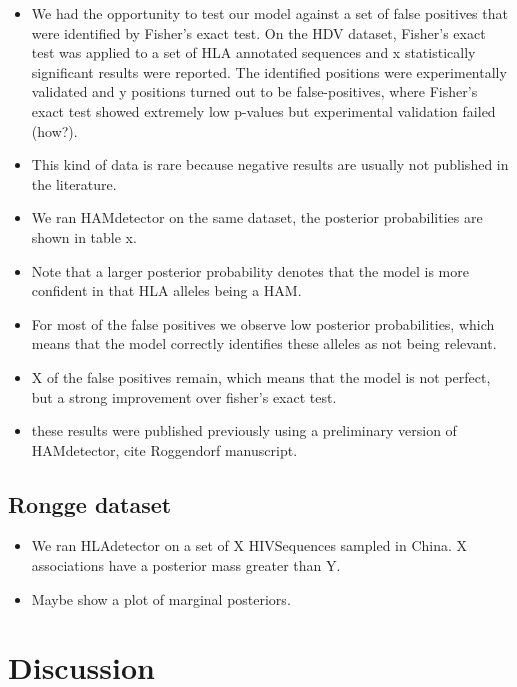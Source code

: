 \documentclass[fleqn,11pt]{SelfArx} %
\begin{document}
\begin{itemize}
  \item We had the opportunity to test our model against a set of false positives that were identified by Fisher's exact test. On the HDV dataset, Fisher's exact test was applied to a set of HLA annotated sequences and x statistically significant results were reported. The identified positions were experimentally validated and y positions turned out to be false-positives, where Fisher's exact test showed extremely low p-values but experimental validation failed (how?).
  \item This kind of data is rare because negative results are usually not published in the literature.
  \item We ran HAMdetector on the same dataset, the posterior probabilities are shown in table x.
  \item Note that a larger posterior probability denotes that the model is more confident in that HLA alleles being a HAM.
  \item For most of the false positives we observe low posterior probabilities, which means that the model correctly identifies these alleles as not being relevant.
  \item X of the false positives remain, which means that the model is not perfect, but a strong improvement over fisher's exact test.
  \item these results were published previously using a preliminary version of HAMdetector, cite Roggendorf manuscript.
\end{itemize}

\subsection{Rongge dataset}
\begin{itemize}
  \item We ran HLAdetector on a set of X HIVSequences sampled in China. X associations have a posterior mass greater than Y.
  \item Maybe show a plot of marginal posteriors.
\end{itemize}


\section{Discussion}
\end{document}
